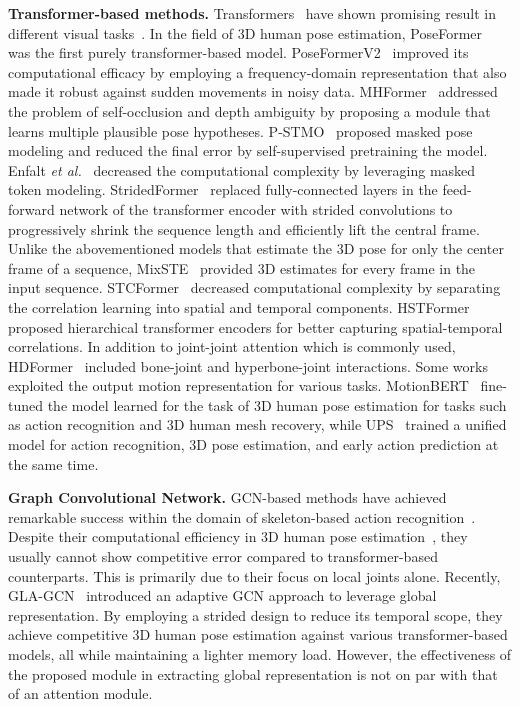 \documentclass[10pt,twocolumn,letterpaper]{article}
\begin{document}
\textbf{Transformer-based methods.} Transformers~\cite{vaswani2017attention} have shown promising result in different visual tasks~\cite{ViT, yu2022coca, su2023towards, zong2022detrs}. In the field of 3D human pose estimation, PoseFormer~\cite{poseformer} was the first purely transformer-based model. PoseFormerV2~\cite{poseformerv2} improved its computational efficacy by employing a frequency-domain representation that also made it robust against sudden movements in noisy data. MHFormer~\cite{li2022mhformer} addressed the problem of self-occlusion and depth ambiguity by proposing a module that learns multiple plausible pose hypotheses. P-STMO~\cite{pstmo} proposed masked pose modeling and reduced the final error by self-supervised pretraining the model. Enfalt \textit{et al.}~\cite{einfalt_up3dhpe_WACV23} decreased the computational complexity by leveraging masked token modeling. StridedFormer~\cite{li2022exploiting} replaced fully-connected layers in the feed-forward network of the transformer encoder with strided convolutions to progressively shrink the sequence length and efficiently lift the central frame. Unlike the abovementioned models that estimate the 3D pose  for only the center frame of a sequence, MixSTE~\cite{mixste} provided 3D estimates for every frame in the input sequence. STCFormer~\cite{STCFormer} decreased computational complexity by separating the correlation learning into spatial and temporal components. HSTFormer~\cite{qian2023hstformer} proposed hierarchical transformer encoders for better capturing spatial-temporal correlations. In addition to joint-joint attention which is commonly used, HDFormer~\cite{chen2023hdformer} included bone-joint and hyperbone-joint interactions. Some works exploited the output motion representation for various tasks. MotionBERT~\cite{motionbert} fine-tuned the model learned for the task of 3D human pose estimation for tasks such as action recognition and 3D human mesh recovery, while UPS~\cite{foo2023unified} trained a unified model for action recognition, 3D pose estimation, and early action prediction at the same time.

\textbf{Graph Convolutional Network.} GCN-based methods have achieved remarkable success within the domain of skeleton-based action recognition~\cite{msg3d, ctrn-gcn, hdgcn}. Despite their computational efficiency in 3D human pose estimation~\cite{choi2020pose2mesh, wang2020motion, zhao2019semantic, ci2019optimizing}, they usually cannot show competitive error compared to transformer-based counterparts. This is primarily due to their focus on local joints alone. Recently, GLA-GCN~\cite{yu2023glagcn} introduced an adaptive GCN approach to leverage global representation. By employing a strided design to reduce its temporal scope, they achieve competitive 3D human pose estimation against various transformer-based models, all while maintaining a lighter memory load.  
However, the effectiveness of the proposed module in extracting global representation is not on par with that of an attention module.
\end{document}
